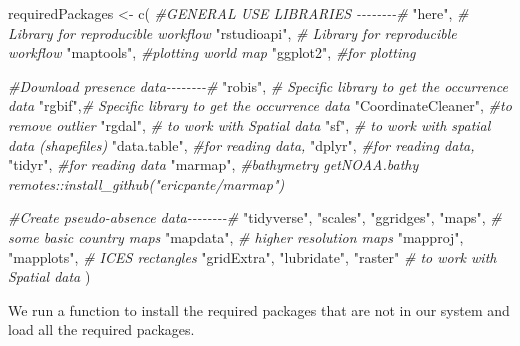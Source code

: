 \documentclass[
]{book}
\newenvironment{Shaded}{\begin{snugshade}}{\end{snugshade}}
\newcommand{\CommentTok}[1]{\textcolor[rgb]{0.56,0.35,0.01}{\textit{#1}}}
\newcommand{\FunctionTok}[1]{\textcolor[rgb]{0.00,0.00,0.00}{#1}}
\newcommand{\NormalTok}[1]{#1}
\newcommand{\OtherTok}[1]{\textcolor[rgb]{0.56,0.35,0.01}{#1}}
\newcommand{\StringTok}[1]{\textcolor[rgb]{0.31,0.60,0.02}{#1}}
\begin{document}
\begin{Shaded}
\begin{Highlighting}[]
\NormalTok{requiredPackages }\OtherTok{\textless{}{-}} \FunctionTok{c}\NormalTok{(}
  \CommentTok{\#GENERAL USE LIBRARIES {-}{-}{-}{-}{-}{-}{-}{-}\#}
  \StringTok{"here"}\NormalTok{, }\CommentTok{\# Library for reproducible workflow}
  \StringTok{"rstudioapi"}\NormalTok{,  }\CommentTok{\# Library for reproducible workflow}
  \StringTok{"maptools"}\NormalTok{, }\CommentTok{\#plotting world map}
  \StringTok{"ggplot2"}\NormalTok{, }\CommentTok{\#for plotting}
  
  \CommentTok{\#Download presence data{-}{-}{-}{-}{-}{-}{-}{-}\#}
  \StringTok{"robis"}\NormalTok{, }\CommentTok{\# Specific library to get the occurrence data}
  \StringTok{"rgbif"}\NormalTok{,}\CommentTok{\# Specific library to get the occurrence data}
  \StringTok{"CoordinateCleaner"}\NormalTok{, }\CommentTok{\#to remove outlier}
  \StringTok{"rgdal"}\NormalTok{, }\CommentTok{\# to work with Spatial data}
  \StringTok{"sf"}\NormalTok{, }\CommentTok{\# to work with spatial data (shapefiles)}
  \StringTok{"data.table"}\NormalTok{, }\CommentTok{\#for reading data,}
  \StringTok{"dplyr"}\NormalTok{, }\CommentTok{\#for reading data,}
  \StringTok{"tidyr"}\NormalTok{, }\CommentTok{\#for reading data}
  \StringTok{"marmap"}\NormalTok{, }\CommentTok{\#bathymetry getNOAA.bathy remotes::install\_github("ericpante/marmap")}
  
  \CommentTok{\#Create pseudo{-}absence data{-}{-}{-}{-}{-}{-}{-}{-}\#}
  \StringTok{"tidyverse"}\NormalTok{, }
  \StringTok{"scales"}\NormalTok{,}
  \StringTok{"ggridges"}\NormalTok{,}
  \StringTok{"maps"}\NormalTok{,     }\CommentTok{\# some basic country maps}
  \StringTok{"mapdata"}\NormalTok{,   }\CommentTok{\# higher resolution maps}
  \StringTok{"mapproj"}\NormalTok{,}
  \StringTok{"mapplots"}\NormalTok{,   }\CommentTok{\# ICES rectangles}
  \StringTok{"gridExtra"}\NormalTok{,}
  \StringTok{"lubridate"}\NormalTok{,}
  \StringTok{"raster"} \CommentTok{\# to work with Spatial data}
\NormalTok{    )}
\end{Highlighting}
\end{Shaded}

We run a function to install the required packages that are not in our system and load all the required packages.
\end{document}
